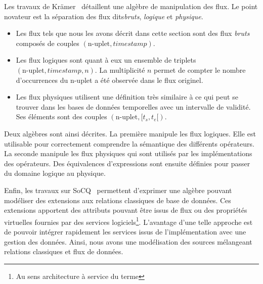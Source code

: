 Les travaux de Krämer~\cite{Kramer:semantics} détaillent une algèbre de manipulation des flux. Le point novateur est la séparation des flux dits\textit{bruts}, \textit{logique} et \textit{physique}. 
\begin{itemize}
	\item Les flux tels que nous les avons décrit dans cette section sont des flux \textit{bruts} composés de couples $(\textrm{n-uplet},\textit{timestamp})$.
	\item Les flux logiques sont quant à eux un ensemble de triplets $(\textrm{n-uplet}, \textit{timestamp}, n)$. La multiplicité $n$ permet de compter le nombre d'occurrences du n-uplet a été observée dans le flux originel.
	\item Les flux physiques utilisent une définition très similaire à ce qui peut se trouver dans les bases de données temporelles avec un intervalle de validité. Ses éléments sont des couples $(\textrm{n-uplet},[t_s, t_e[)$.
\end{itemize} 
Deux algèbres sont ainsi décrites. La première manipule les flux logiques. Elle est utilisable pour correctement comprendre la sémantique des différents opérateurs. La seconde manipule les flux physiques qui sont utilisés par les implémentations des opérateurs. Des équivalences d'expressions sont ensuite définies pour passer du domaine logique au physique.

Enfin, les travaux sur SoCQ~\cite{Gripay:algebra} permettent d'exprimer une algèbre pouvant modéliser des extensions aux relations classiques de base de données. Ces extensions apportent des attributs pouvant être issus de flux ou des propriétés virtuelles fournies par des services logiciels\footnote{Au sens architecture à service du terme}. L'avantage d'une telle approche est de pouvoir intégrer rapidement les services issus de l'implémentation avec une gestion des données. Ainsi, nous avons une modélisation des sources mélangeant relations classiques et flux de données.

